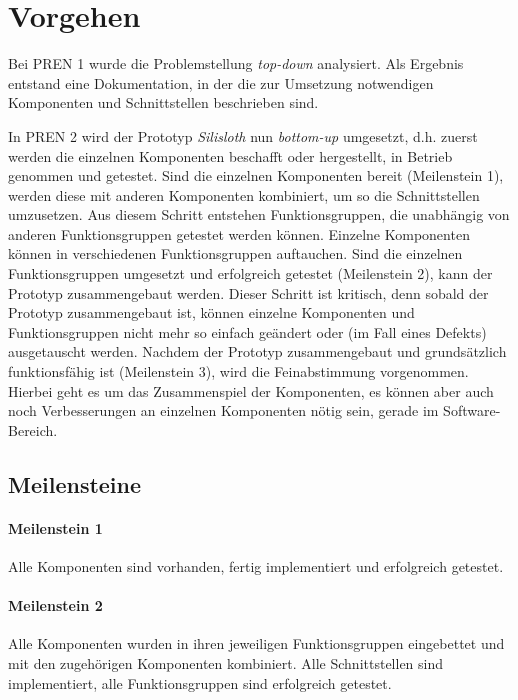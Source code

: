 \documentclass[a4paper,11pt]{scrartcl}
\begin{document}

\newpage

\section{Vorgehen}

Bei PREN 1 wurde die Problemstellung \textit{top-down} analysiert. Als Ergebnis entstand eine Dokumentation, in der die zur Umsetzung notwendigen Komponenten und Schnittstellen beschrieben sind.

In PREN 2 wird der Prototyp \textit{Silisloth} nun \textit{bottom-up} umgesetzt, d.h. zuerst werden die einzelnen Komponenten beschafft oder hergestellt, in Betrieb genommen und getestet. Sind die einzelnen Komponenten bereit (Meilenstein 1), werden diese mit anderen Komponenten kombiniert, um so die Schnittstellen umzusetzen. Aus diesem Schritt entstehen Funktionsgruppen, die unabhängig von anderen Funktionsgruppen getestet werden können. Einzelne Komponenten können in verschiedenen Funktionsgruppen auftauchen. Sind die einzelnen Funktionsgruppen umgesetzt und erfolgreich getestet (Meilenstein 2), kann der Prototyp zusammengebaut werden. Dieser Schritt ist kritisch, denn sobald der Prototyp zusammengebaut ist, können einzelne Komponenten und Funktionsgruppen nicht mehr so einfach geändert oder (im Fall eines Defekts) ausgetauscht werden. Nachdem der Prototyp zusammengebaut und grundsätzlich funktionsfähig ist (Meilenstein 3), wird die Feinabstimmung vorgenommen. Hierbei geht es um das Zusammenspiel der Komponenten, es können aber auch noch Verbesserungen an einzelnen Komponenten nötig sein, gerade im Software-Bereich.

\subsection{Meilensteine}

\paragraph{Meilenstein 1} Alle Komponenten sind vorhanden, fertig implementiert und erfolgreich getestet.

\paragraph{Meilenstein 2} Alle Komponenten wurden in ihren jeweiligen Funktionsgruppen eingebettet und mit den zugehörigen Komponenten kombiniert. Alle Schnittstellen sind implementiert, alle Funktionsgruppen sind erfolgreich getestet.
\end{document}

